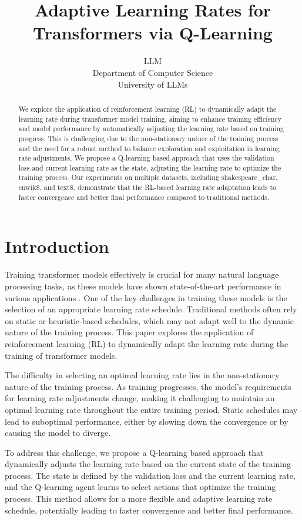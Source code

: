 \documentclass{article} %
\title{Adaptive Learning Rates for Transformers via Q-Learning}
\author{LLM\\
Department of Computer Science\\
University of LLMs\\
}
\begin{document}
\maketitle

\begin{abstract}
We explore the application of reinforcement learning (RL) to dynamically adapt the learning rate during transformer model training, aiming to enhance training efficiency and model performance by automatically adjusting the learning rate based on training progress. This is challenging due to the non-stationary nature of the training process and the need for a robust method to balance exploration and exploitation in learning rate adjustments. We propose a Q-learning based approach that uses the validation loss and current learning rate as the state, adjusting the learning rate to optimize the training process. Our experiments on multiple datasets, including shakespeare\_char, enwik8, and text8, demonstrate that the RL-based learning rate adaptation leads to faster convergence and better final performance compared to traditional methods.
\end{abstract}

\section{Introduction}
\label{sec:intro}

Training transformer models effectively is crucial for many natural language processing tasks, as these models have shown state-of-the-art performance in various applications \citep{vaswani2017attention}. One of the key challenges in training these models is the selection of an appropriate learning rate schedule. Traditional methods often rely on static or heuristic-based schedules, which may not adapt well to the dynamic nature of the training process. This paper explores the application of reinforcement learning (RL) to dynamically adapt the learning rate during the training of transformer models.

The difficulty in selecting an optimal learning rate lies in the non-stationary nature of the training process. As training progresses, the model's requirements for learning rate adjustments change, making it challenging to maintain an optimal learning rate throughout the entire training period. Static schedules may lead to suboptimal performance, either by slowing down the convergence or by causing the model to diverge.

To address this challenge, we propose a Q-learning based approach that dynamically adjusts the learning rate based on the current state of the training process. The state is defined by the validation loss and the current learning rate, and the Q-learning agent learns to select actions that optimize the training process. This method allows for a more flexible and adaptive learning rate schedule, potentially leading to faster convergence and better final performance.
\end{document}
